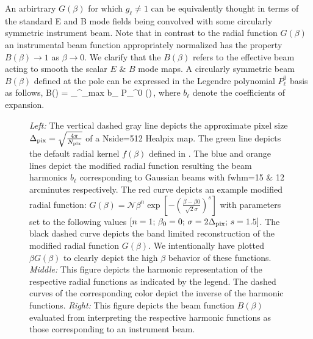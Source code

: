 An arbirtrary $G(\beta)$ for which $g_{\ell} \neq 1$ can be equivalently thought in terms of the standard E and B mode fields being convolved with some circularly symmetric instrument beam. 
Note that in contrast to the radial function $G(\beta)$ an instrumental beam function appropriately normalized has the property $B(\beta) \rightarrow 1$ as $\beta \rightarrow 0$. We clarify that the $B(\beta)$ refers to the effective beam acting to smooth the scalar $E$ \& $B$ mode maps. A circularly symmetric beam $B(\beta)$ defined at the pole can be expressed in the Legendre polynomial $P_{\ell}^0$ basis as follows,
%
\beq
B(\beta) = \sum_{}^{\ell_{\rm max}}  b_{\ell} P_{\ell}^{0} (\cos{\beta})\,,
\eeq
%
where $b_{\ell}$ denote the coefficients of expansion. 
%
\begin{figure}[!t] 
\centering
{}
\caption{\textit{Left:} The vertical dashed gray line depicts the approximate pixel size $\Delta_{\rm pix} = \sqrt{\frac{4 \pi}{N_{\rm pix}}}$ of a Nside=512 Healpix map. The green line depicts the default radial kernel $f(\beta)$ defined in . The blue and orange lines depict the modified radial function resulting the beam harmonics $b_{\ell}$ corresponding to Gaussian beams with fwhm=15 \& 12 arcminutes respectively. The red curve depicts an example modified radial function: $G(\beta)=\mathcal{N} \beta^n \exp{\left[ -\left( \frac{\beta-\beta0}{\sqrt{2} \sigma} \right)^s \right]}$ with parameters set to the following values $[n=1;\, \beta_0=0 ;\, \sigma = 2\Delta_{\rm pix} ;\, s=1.5]$. The black dashed curve depicts the band limited reconstruction of the modified radial function $G(\beta)$. We intentionally have plotted $\beta G(\beta)$ to clearly depict the high $\beta$ behavior of these functions. \textit{Middle: } This figure depicts the harmonic representation of the respective radial functions as indicated by the legend. The dashed curves of the corresponding color depict the inverse of the harmonic functions. \textit{Right:} This figure depicts the beam function $B(\beta)$ evaluated from interpreting the respective harmonic functions as those corresponding to an instrument beam.}
\label{fig:example_gbeta}
\end{figure}
%

